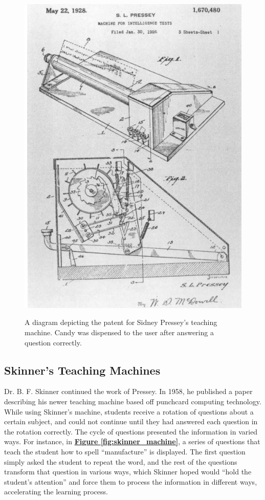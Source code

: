  \begin{figure}[h]
 	\includegraphics[width=1.0\linewidth]{figures/pressey_machine}
 	\caption{A diagram depicting the patent for Sidney Pressey's teaching machine. Candy was dispensed to the user after answering a question correctly.}
 	\label{fig:pressey_machine}
 	\cite{benjamin1988history}
 \end{figure}
 
 \subsection{Skinner's Teaching Machines}
 \par Dr. B. F. Skinner continued the work of Pressey. In 1958, he published a paper \cite{Skinner969} describing his newer teaching machine based off punchcard computing technology. While using Skinner's machine, students receive a rotation of questions about a certain subject, and could not continue until they had answered each question in the rotation correctly. The cycle of questions presented the information in varied ways. For instance, in \textbf{\hyperref[fig:skinner_machine]{Figure \ref*{fig:skinner_machine}}}, a series of questions that teach the student how to spell ``manufacture'' is displayed. The first question simply asked the student to repeat the word, and the rest of the questions transform that question in various ways, which Skinner hoped would ``hold the student's attention'' and force them to process the information in different ways, accelerating the learning process. 
 
